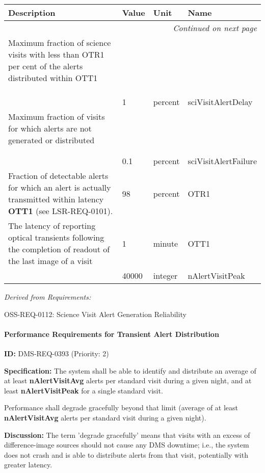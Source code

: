 \documentclass[SE,toc,lsstdraft]{lsstdoc}
\makeatletter
\newcommand{\paramname}[1]{\hspace{0pt}#1}
\newcommand{\unitname}[1]{\hspace{0pt}#1}
\newenvironment{parameters}[0]{%
\setlength\LTleft{0pt}
\setlength\LTright{\fill}
\begin{small}
\begin{longtable}[]{|p{0.49\textwidth}|l|p{0.6in}|p{1.70in}@{}|}

\hline \textbf{Description} & \textbf{Value} & \textbf{Unit} & \textbf{Name} \\ \hline
\endhead

\hline \multicolumn{4}{r}{\emph{Continued on next page}} \\
\endfoot

\hline\hline
\endlastfoot
}{%
\hline
\end{longtable}
\end{small}
}
\makeatother
\begin{document}
\begin{parameters}
Maximum fraction of science visits with less than OTR1 per cent of the alerts distributed within OTT1
\\
\\
\\
\\
&
1
&
\unitname{%
percent
}
&
\paramname{%
sciVisitAlertDelay
} \\\hline
Maximum fraction of visits for which alerts are not generated or distributed
\\
\\
\\
&
0.1
&
\unitname{%
percent
}
&
\paramname{%
sciVisitAlertFailure
} \\\hline
Fraction of detectable alerts for which an alert is actually transmitted within latency \textbf{OTT1} (see LSR-REQ-0101).
&
98
&
\unitname{%
percent
}
&
\paramname{%
OTR1
} \\\hline
The latency of reporting optical transients following the completion of readout of the last image of a visit
&
1
&
\unitname{%
minute
}
&
\paramname{%
OTT1
} \\\hline

&
40000
&
\unitname{%
integer
}
&
\paramname{%
nAlertVisitPeak
} \\\hline
\end{parameters}

\emph{Derived from Requirements:}

OSS-REQ-0112:
Science Visit Alert Generation Reliability \newline

\paragraph{Performance Requirements for Transient Alert Distribution}\hfill  %

\label{DMS-REQ-0393}
\textbf{ID:} DMS-REQ-0393 (Priority: 2)

\textbf{Specification:}
The system shall be able to identify and distribute an average of at least \textbf{nAlertVisitAvg} alerts per standard visit during a given night, and at least \textbf{nAlertVisitPeak} for a single standard visit.

Performance shall degrade gracefully beyond that limit (average of at least \textbf{nAlertVisitAvg} alerts per standard visit during a given night).

\textbf{Discussion:}
The term 'degrade gracefully' means that visits with an excess of difference-image sources should not cause any DMS downtime; i.e., the system does not crash and is able to distribute alerts from that visit, potentially with greater latency.
\end{document}
